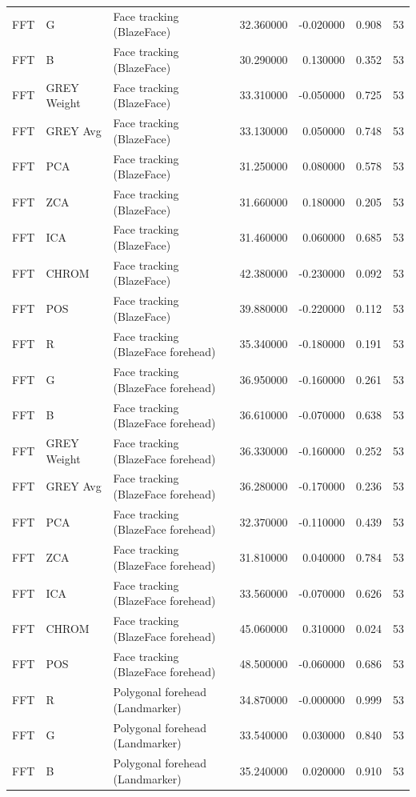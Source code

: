 \begin{table}[htbp]
\begin{tabular}{l l l r r l r}
FFT & G & Face tracking (BlazeFace) & 32.360000 & -0.020000 & 0.908 & 53 \\
FFT & B & Face tracking (BlazeFace) & 30.290000 & 0.130000 & 0.352 & 53 \\
FFT & GREY Weight & Face tracking (BlazeFace) & 33.310000 & -0.050000 & 0.725 & 53 \\
FFT & GREY Avg & Face tracking (BlazeFace) & 33.130000 & 0.050000 & 0.748 & 53 \\
FFT & PCA & Face tracking (BlazeFace) & 31.250000 & 0.080000 & 0.578 & 53 \\
FFT & ZCA & Face tracking (BlazeFace) & 31.660000 & 0.180000 & 0.205 & 53 \\
FFT & ICA & Face tracking (BlazeFace) & 31.460000 & 0.060000 & 0.685 & 53 \\
FFT & CHROM & Face tracking (BlazeFace) & 42.380000 & -0.230000 & 0.092 & 53 \\
FFT & POS & Face tracking (BlazeFace) & 39.880000 & -0.220000 & 0.112 & 53 \\
FFT & R & Face tracking (BlazeFace forehead) & 35.340000 & -0.180000 & 0.191 & 53 \\
FFT & G & Face tracking (BlazeFace forehead) & 36.950000 & -0.160000 & 0.261 & 53 \\
FFT & B & Face tracking (BlazeFace forehead) & 36.610000 & -0.070000 & 0.638 & 53 \\
FFT & GREY Weight & Face tracking (BlazeFace forehead) & 36.330000 & -0.160000 & 0.252 & 53 \\
FFT & GREY Avg & Face tracking (BlazeFace forehead) & 36.280000 & -0.170000 & 0.236 & 53 \\
FFT & PCA & Face tracking (BlazeFace forehead) & 32.370000 & -0.110000 & 0.439 & 53 \\
FFT & ZCA & Face tracking (BlazeFace forehead) & 31.810000 & 0.040000 & 0.784 & 53 \\
FFT & ICA & Face tracking (BlazeFace forehead) & 33.560000 & -0.070000 & 0.626 & 53 \\
FFT & CHROM & Face tracking (BlazeFace forehead) & 45.060000 & 0.310000 & 0.024 & 53 \\
FFT & POS & Face tracking (BlazeFace forehead) & 48.500000 & -0.060000 & 0.686 & 53 \\
FFT & R & Polygonal forehead (Landmarker) & 34.870000 & -0.000000 & 0.999 & 53 \\
FFT & G & Polygonal forehead (Landmarker) & 33.540000 & 0.030000 & 0.840 & 53 \\
FFT & B & Polygonal forehead (Landmarker) & 35.240000 & 0.020000 & 0.910 & 53 \\

\end{tabular}
\end{table}
